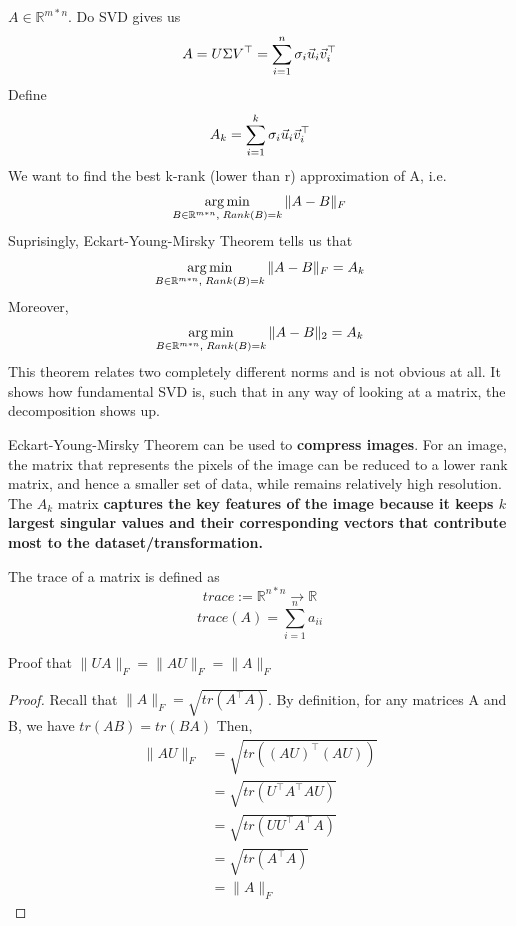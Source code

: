 \begin{theorem}
	$A \in \mathbb{R}^{m*n}$. Do SVD gives us
	\[
A = U \Sigma V^\top = \sum_{i=1}^n \sigma_i\vec{u}_i\vec{v}_i^\top
	\]
	Define
	\[
A_k = \sum_{i=1}^k \sigma_i\vec{u}_i\vec{v}_i^\top
	\]
	We want to find the best k-rank (lower than r) approximation of A, i.e.
	\[
\operatorname*{arg\,min}_{B\in \mathbb{R}^{m*n},\;Rank(B)=k}\|A-B\|_F
	\]
	Suprisingly, Eckart-Young-Mirsky Theorem tells us that
	\[
\operatorname*{arg\,min}_{B\in \mathbb{R}^{m*n},\;Rank(B)=k}\|A-B\|_F = A_k
	\]
	Moreover,
	\[
\operatorname*{arg\,min}_{B\in \mathbb{R}^{m*n},\;Rank(B)=k}\|A-B\|_2 = A_k
	\]
	This theorem relates two completely different norms and is not obvious at all. It shows how fundamental SVD is, such that in any way of looking at a matrix, the decomposition shows up.
\end{theorem}

\begin{remark}
	Eckart-Young-Mirsky Theorem can be used to \textbf{compress images}. For an image, the matrix that represents the pixels of the image can be reduced to a lower rank matrix, and hence a smaller set of data, while remains relatively high resolution. The $A_k$ matrix \textbf{captures the key features of the image because it keeps $k$ largest singular values and their corresponding vectors that contribute most to the dataset/transformation.}
\end{remark}

\begin{definition}[trace]
	The trace of a matrix is defined as
	\[
	trace := \mathbb{R}^{n*n} \rightarrow \mathbb{R}
	\]
	\[
trace(A) = \sum_{i=1}^na_{ii}
	\]
\end{definition}

\begin{remark}
	Proof that $\|UA\|_F = \|AU\|_F = \|A\|_F$
	\begin{proof}
		Recall that $\|A\|_F = \sqrt{tr(A^\top A)}$. By definition, for any matrices A and B, we have $tr(AB)=tr(BA)$ Then,
		\begin{align*}
			\|AU\|_F &= \sqrt{tr((AU)^\top(AU))}\\
			&= \sqrt{tr(U^\top A^\top AU)}\\
			&= \sqrt{tr(UU^\top A^\top A)}\\
			&= \sqrt{tr(A^\top A)}\\
			&= \|A\|_F
		\end{align*}
	\end{proof}
\end{remark}

